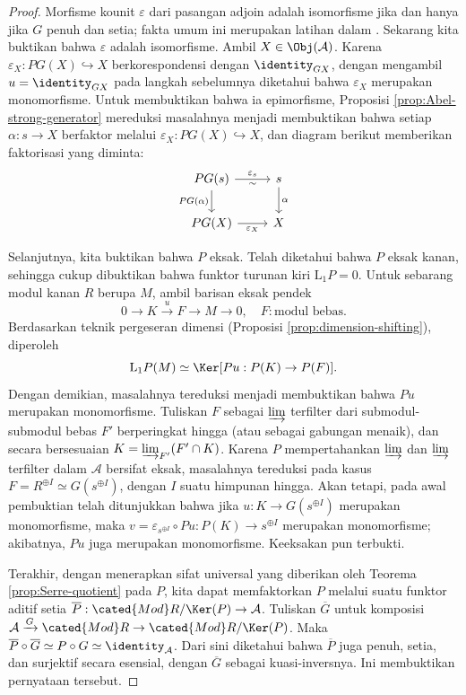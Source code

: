\begin{proof}
	Morfisme kounit $\varepsilon$ dari pasangan adjoin adalah isomorfisme jika dan hanya jika $G$ penuh dan setia; fakta umum ini merupakan latihan dalam . Sekarang kita buktikan bahwa $\varepsilon$ adalah isomorfisme. Ambil $X \in \Obj(\mathcal{A})$. Karena $\varepsilon_X: PG(X) \hookrightarrow X$ berkorespondensi dengan $\identity_{GX}$, dengan mengambil $u = \identity_{GX}$ pada langkah sebelumnya diketahui bahwa $\varepsilon_X$ merupakan monomorfisme. Untuk membuktikan bahwa ia epimorfisme, Proposisi \ref{prop:Abel-strong-generator} mereduksi masalahnya menjadi membuktikan bahwa setiap $\alpha: s \to X$ berfaktor melalui $\varepsilon_X: PG(X) \hookrightarrow X$, dan diagram berikut memberikan faktorisasi yang diminta:
	\[\begin{tikzcd}
		PG(s) \arrow[r, "\sim"', "\varepsilon_s"] \arrow[d, "{PG(\alpha)}"'] & s \arrow[d, "\alpha"] \\
		PG(X) \arrow[r, "{\varepsilon_X}"'] & X
	\end{tikzcd}\]
	
	Selanjutnya, kita buktikan bahwa $P$ eksak. Telah diketahui bahwa $P$ eksak kanan, sehingga cukup dibuktikan bahwa funktor turunan kiri $\mathrm{L}_1 P = 0$. Untuk sebarang modul kanan $R$ berupa $M$, ambil barisan eksak pendek
	\[ 0 \to K \xrightarrow{u} F \to M \to 0, \quad F: \text{modul bebas}. \]
	Berdasarkan teknik pergeseran dimensi (Proposisi \ref{prop:dimension-shifting}), diperoleh
	\[ \mathrm{L}_1 P (M) \simeq \Ker[Pu: P(K) \to P(F)]. \]
	Dengan demikian, masalahnya tereduksi menjadi membuktikan bahwa $Pu$ merupakan monomorfisme. Tuliskan $F$ sebagai $\varinjlim$ terfilter dari submodul-submodul bebas $F'$ berperingkat hingga (atau sebagai gabungan menaik), dan secara bersesuaian $K = \varinjlim_{F'} (F' \cap K)$. Karena $P$ mempertahankan $\varinjlim$ dan $\varinjlim$ terfilter dalam $\mathcal{A}$ bersifat eksak, masalahnya tereduksi pada kasus $F = R^{\oplus I} \simeq G(s^{\oplus I})$, dengan $I$ suatu himpunan hingga. Akan tetapi, pada awal pembuktian telah ditunjukkan bahwa jika $u: K \to G(s^{\oplus I})$ merupakan monomorfisme, maka $v = \varepsilon_{s^{\oplus I}} \circ Pu : P(K) \to s^{\oplus I}$ merupakan monomorfisme; akibatnya, $Pu$ juga merupakan monomorfisme. Keeksakan pun terbukti.
	
	Terakhir, dengan menerapkan sifat universal yang diberikan oleh Teorema \ref{prop:Serre-quotient} pada $P$, kita dapat memfaktorkan $P$ melalui suatu funktor aditif setia $\overline{P}: \cated{Mod}R / \Ker(P) \to \mathcal{A}$. Tuliskan $\overline{G}$ untuk komposisi $\mathcal{A} \xrightarrow{G} \cated{Mod}R \to \cated{Mod}R / \Ker(P)$. Maka $\overline{P} \circ \overline{G} \simeq P \circ G \simeq \identity_{\mathcal{A}}$. Dari sini diketahui bahwa $\overline{P}$ juga penuh, setia, dan surjektif secara esensial, dengan $\overline{G}$ sebagai kuasi-inversnya. Ini membuktikan pernyataan tersebut.
\end{proof}

